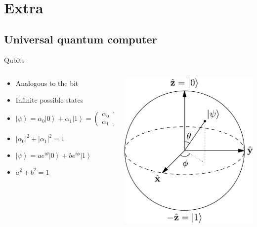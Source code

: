 \documentclass[14pt]{beamer}
\newcommand{\braket}[1]{\ensuremath{\left | #1 \right \rangle}}
\begin{document}
\section{Extra}
\subsection{Universal quantum computer}
\begin{frame}{Qubits}
\begin{columns}[T]
	\begin{column}{.6\textwidth}
		\begin{block}{}
			\begin{itemize}
				\item Analogous to the bit
				\item Infinite possible states
				\item $ \left | \psi \right \rangle=\alpha _{0}\left | 0 \right \rangle+\alpha _{1}\left | 1 \right \rangle=\begin{pmatrix}\alpha_{0}\\ \alpha_{1}\end{pmatrix}$
				\item $ \left | \alpha_{0} \right |^{2} + \left | \alpha_{1} \right |^{2}=1$
				\item $\braket{\psi} = ae^{i\theta}\braket{0} + be^{i\phi}\braket{1}$
				\item $a^2 + b^2 = 1$
			\end{itemize}
    	\end{block}
	\end{column}
	\begin{column}{.4\textwidth}
    	\begin{block}{}
			\includegraphics[width=1\textwidth]{../resources/pdfs/Bloch_Sphere.pdf}

\end{block}
\end{column}
\end{columns}
\end{frame}
\end{document}
